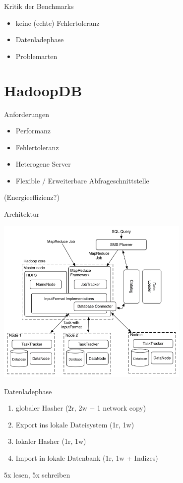 \documentclass{beamer}
\begin{document}
\begin{frame}{Kritik der Benchmarks}
  \begin{itemize}
    \item keine (echte) Fehlertoleranz
    \item Datenladephase
    \item Problemarten
  \end{itemize}
\end{frame}

\section{HadoopDB}

\begin{frame}{Anforderungen}
  \begin{itemize}
    \item Performanz
    \item Fehlertoleranz
    \item Heterogene Server
    \item Flexible / Erweiterbare Abfrageschnittstelle
  \end{itemize}
  (Energieeffizienz?)
\end{frame}

\begin{frame}{Architektur}
  \begin{center}
    \includegraphics[width=0.7\textwidth]{../ausarbeitung/images/hadoopdb-arch.png}    
  \end{center}
\end{frame}

\begin{frame}{Datenladephase}
  \begin{enumerate}
    \item globaler Hasher (2r, 2w + 1 network copy)
    \item Export ins lokale Dateisystem (1r, 1w)
    \item lokaler Hasher (1r, 1w)
    \item Import in lokale Datenbank (1r, 1w + Indizes)
  \end{enumerate}
  \pause
  5x lesen, 5x schreiben
\end{frame}
\end{document}
